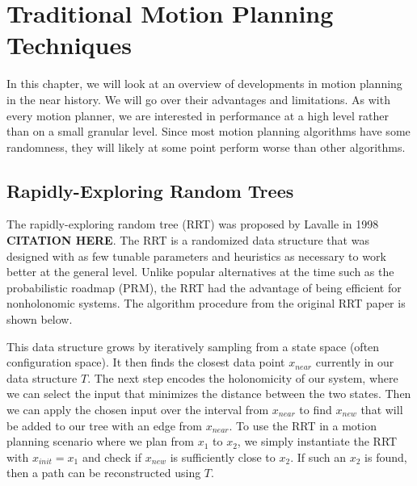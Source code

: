 \chapter{Traditional Motion Planning Techniques} \label{planning:techniques}
In this chapter, we will look at an overview of developments in motion planning in the near history. We will go over their advantages and limitations. As with every motion planner, we are interested in performance at a high level rather than on a small granular level. Since most motion planning algorithms have some randomness, they will likely at some point perform worse than other algorithms.

\section{Rapidly-Exploring Random Trees} \label{planning:rrt}
The rapidly-exploring random tree (RRT) was proposed by Lavalle in 1998 \textbf{CITATION HERE}. The RRT is a randomized data structure that was designed with as few tunable parameters and heuristics as necessary to work better at the general level. Unlike popular alternatives at the time such as the probabilistic roadmap (PRM), the RRT had the advantage of being efficient for nonholonomic systems. The algorithm procedure from the original RRT paper is shown below.

{}

This data structure grows by iteratively sampling from a state space (often configuration space). It then finds the closest data point $x_{near}$ currently in our data structure $T$. The next step encodes the holonomicity of our system, where we can select the input that minimizes the distance between the two states. Then we can apply the chosen input over the interval from $x_{near}$ to find $x_{new}$ that will be added to our tree with an edge from $x_{near}$. To use the RRT in a motion planning scenario where we plan from $x_1$ to $x_2$, we simply instantiate the RRT with $x_{init} = x_1$ and check if $x_{new}$ is sufficiently close to $x_2$. If such an $x_2$ is found, then a path can be reconstructed using $T$.

